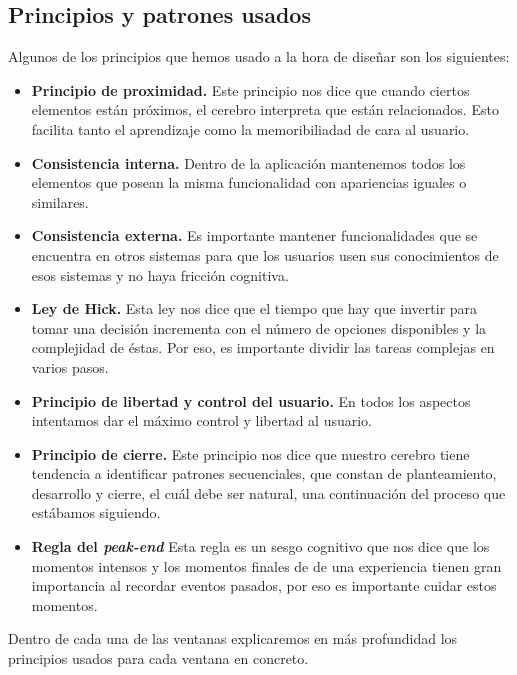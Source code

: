 \subsection{Principios y patrones usados}

Algunos de los principios que hemos usado a la hora de diseñar son los siguientes:

\begin{itemize}

      \item \textbf{Principio de proximidad.} Este principio nos dice que cuando ciertos elementos están próximos, el cerebro interpreta
            que están relacionados. Esto facilita tanto el aprendizaje como la memoribiliadad de cara al usuario.
      \item \textbf{Consistencia interna.} Dentro de la aplicación mantenemos todos los elementos que posean la misma funcionalidad con apariencias iguales
            o similares. 
      \item \textbf{Consistencia externa.} Es importante mantener funcionalidades que se encuentra en otros sistemas para que los usuarios usen sus conocimientos
            de esos sistemas y no haya fricción cognitiva.
      \item \textbf{Ley de Hick.} Esta ley nos dice que el tiempo que hay que invertir para tomar una decisión incrementa con el número de opciones disponibles y la complejidad
            de éstas. Por eso, es importante dividir las tareas complejas en varios pasos.
      \item \textbf{Principio de libertad y control del usuario.} En todos los aspectos intentamos dar el máximo control y libertad al usuario.
      \item \textbf{Principio de cierre.} Este principio nos dice que nuestro cerebro tiene tendencia a identificar patrones secuenciales, que constan de planteamiento, desarrollo y cierre,
            el cuál debe ser natural, una continuación del proceso que estábamos siguiendo.
      \item \textbf{Regla del \textit{peak-end}} Esta regla es un sesgo cognitivo que nos dice que los momentos intensos y los momentos finales de
            de una experiencia tienen gran importancia al recordar eventos pasados, por eso es importante cuidar estos momentos.

\end{itemize}

Dentro de cada una de las ventanas explicaremos en más profundidad los principios usados para cada ventana en concreto.
